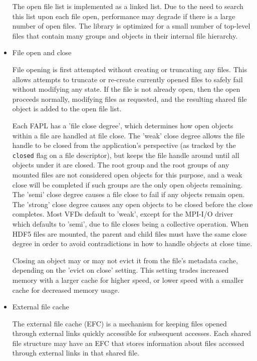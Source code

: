 \begin{itemize}
The open file list is implemented as a linked list. Due to the need to search this list upon each file open, performance may degrade if there is a large number of open files. The library is optimized for a small number of top-level files that contain many groups and objects in their internal file hierarchy.

    \item File open and close

File opening is first attempted without creating or truncating any files. This allows attempts to truncate or re-create currently opened files to safely fail without modifying any state. If the file is not already open, then the open proceeds normally, modifying files as requested, and the resulting shared file object is added to the open file list.

Each FAPL has a 'file close degree', which determines how open objects within a file are handled at file close. The 'weak' close degree allows the file handle to be closed from the application's perspective (as tracked by the \texttt{closed} flag on a file descriptor), but keeps the file handle around until all objects under it are closed. The root group and the root groups of any mounted files are not considered open objects for this purpose, and a weak close will be completed if such groups are the only open objects remaining. The 'semi' close degree causes a file close to fail if any objects remain open. The 'strong' close degree causes any open objects to be closed before the close completes. Most VFDs default to 'weak', except for the MPI-I/O driver which defaults to 'semi', due to file closes being a collective operation. When HDF5 files are mounted, the parent and child files must have the same close degree in order to avoid contradictions in how to handle objects at close time.

Closing an object may or may not evict it from the file's metadata cache, depending on the 'evict on close' setting. This setting trades increased memory with a larger cache for higher speed, or lower speed with a smaller cache for decreased memory usage.

    \item External file cache

The external file cache (EFC) is a mechanism for keeping files opened through external links quickly accessible for subsequent accesses. Each shared file structure may have an EFC that stores information about files accessed through external links in that shared file.


\end{itemize}
